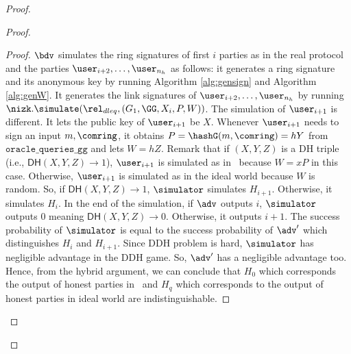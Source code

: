 \begin{proof}
\begin{proof}
\begin{proof}
			
			$\bdv $ simulates the ring signatures of first $ i $ parties as in the real protocol and the parties $ \user_{i+2}, \ldots, \user_{n_h} $ as follows: it generates a ring signature and its anonymous key by running Algorithm \ref{alg:gensign} and Algorithm \ref{alg:genW}. It generates the link signatures of $ \user_{i+2}, \ldots, \user_{n_h} $ by running $ \nizk.\simulate(\rel_{dleq}, (G_1, \GG,X_i, P,W)) $. The simulation of $ \user_{i + 1} $ is different. It lets the public key of $ \user_{i + 1} $ be $ X$. Whenever $ \user_{i+1} $ needs to sign an input $ m, \comring $, it obtains $ P = \hashG(m, \comring) = hY $ from $ \mathtt{oracle\_queries\_gg} $ and lets $ W = hZ $. Remark that if $ (X,Y,Z)$ is a DH triple (i.e., $  \mathsf{DH}(X,Y,Z) \rightarrow 1 $), $ \user_{i+1} $ is simulated as in \name \ because $ W = xP $ in this case. Otherwise, $ \user_{i+1} $ is simulated as in the ideal world because $ W $ is random. So, if $  \mathsf{DH}(X,Y,Z)  \rightarrow 1$, $\simulator $ simulates $ H_{i+1} $. Otherwise, it simulates $ H_{i} $. In the end of the simulation, if $ \adv $ outputs $ i $, $\simulator $ outputs $ 0 $ meaning $  \mathsf{DH}(X,Y,Z) \rightarrow 0$. Otherwise, it outputs $ i + 1 $. The success probability of $\simulator $ is equal to the success probability of $ \adv' $ which distinguishes $ H_i $ and $ H_{i +1} $. Since DDH problem is hard, $\simulator $ has negligible advantage in the DDH game. So, $ \adv' $ has a negligible advantage too. Hence, from the hybrid argument, we can conclude that $ H_0    $ which corresponds the output of honest parties in  \name\ and $ H_q  $ which corresponds to  the output of honest parties in ideal world are indistinguishable.
			

\end{proof}
\end{proof}
\end{proof}
